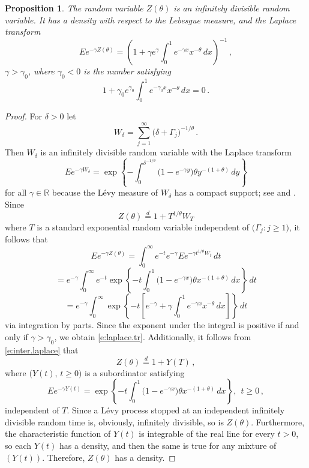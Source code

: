 \documentclass[11pt]{amsart}
\newtheorem{prop}{Proposition}[section]
\numberwithin{equation}{section}
\begin{document}
\begin{prop}\label{prop:Ztheta}
The random variable $Z(\theta)$ is an infinitely divisible random
variable. It has a density with respect to the Lebesgue measure,
and the Laplace transform
\begin{equation} \label{e:laplace.tr}
Ee^{-\gamma Z(\theta)} = \left( 1 + \gamma e^\gamma\int_0^1
e^{-\gamma x}x^{-\theta}\, dx\right)^{-1}\,,
\end{equation}
$\gamma> \gamma_0$, where $\gamma_0<0$ is the number satisfying
$$
1 + \gamma_0 e^{\gamma_0}\int_0^1
e^{-\gamma_0 x}x^{-\theta}\, dx =0\,.
$$
\end{prop}
\begin{proof}
For $\delta>0$ let
$$
W_\delta = \sum_{j=1}^\infty \bigl( \delta +
\Gamma_j\bigr)^{-1/\theta}\,.
$$
Then $W_\delta$ is an infinitely divisible random variable with the
Laplace transform
$$
Ee^{-\gamma W_\delta} = \exp\left\{ - \int_0^{\delta^{-1/\theta}}
\bigl( 1- e^{-\gamma y}\bigr) \theta y^{-(1+\theta)}\, dy\right\}
$$
for all $\gamma\in{{\mathbb R}}$ because the L\'evy measure of $W_\delta$ has a
compact support; see \cite{rosinski:1990b} and \cite{sato:1999}. Since
$$Z(\theta){\stackrel{d}{=}}1+T^{1/\theta}W_T$$
where $T$ is a standard exponential random variable independent of
$\bigl(\Gamma_j:j\ge1\bigr)$, it follows that
\begin{equation} \label{e:inter.laplace}
Ee^{-\gamma Z(\theta)} = \int_0^\infty e^{-t} e^{-\gamma} Ee^{-\gamma
t^{1/\theta} W_t}\, dt
\end{equation}
$$
= e^{-\gamma} \int_0^\infty e^{-t} \exp\left\{ - t\int_0^1 \bigl( 1-
e^{-\gamma x}\bigr) \theta x^{-(1+\theta)}\, dx\right\}\, dt
$$
$$
= e^{-\gamma} \int_0^\infty\exp\left\{ -t\left[ e^{-\gamma} + \gamma
    \int_0^1 e^{-\gamma x}x^{-\theta}\, dx\right]\right\}\, dt
$$
via integration by parts. Since the exponent under the integral is
positive if and only if $\gamma>\gamma_0$, we obtain
\eqref{e:laplace.tr}. Additionally, it follows from
\eqref{e:inter.laplace} that
\begin{equation} \label{e:mixture}
Z(\theta) {\stackrel{d}{=}} 1+Y(T)\,,
\end{equation}
where $\bigl( Y(t),\, t\geq 0\bigr)$ is a subordinator satisfying
\begin{equation}\label{prop:Ztheta:eq1}
Ee^{-\gamma Y(t)} = \exp\left\{ - t\int_0^1 \bigl( 1-
e^{-\gamma x}\bigr) \theta x^{-(1+\theta)}\, dx\right\}, \ \  t\geq
0\,,
\end{equation}
independent of $T$. Since a
L\'evy process stopped at an independent infinitely divisible random
time is, obviously, infinitely divisible, so is
$Z(\theta)$. Furthermore, the characteristic function of $Y(t)$ is
integrable of the real line for every $t>0$, so each $Y(t)$ has a
density, and then the same is true for any mixture of
$(Y(t))$. Therefore, $Z(\theta)$ has a density.
\end{proof}
\end{document}
